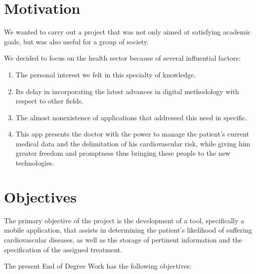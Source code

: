 \documentclass[11pt,spanish,
		listoftables,listoffigures]
		{tfgplantilla}
\begin{document}
\section{Motivation}

We wanted to carry out a project that was not only aimed at satisfying academic goals, but was also useful for a group of society.

We decided to focus on the health sector because of several influential factors:

\begin{enumerate}
	\item The personal interest we felt in this specialty of knowledge.

	\item Its delay in incorporating the latest advances in digital methodology with respect to other fields.

	\item The almost nonexistence of applications that addressed this need in specific.
	\item This app presents the doctor with the power to manage the patient's current medical data and the delimitation of his cardiovascular risk, while giving him greater freedom and promptness thus bringing these people to the new technologies.
\end{enumerate}

\section{Objectives}

The primary objective of the project is the development of a tool, specifically a mobile application, that assists in determining the patient's likelihood of suffering cardiovascular diseases, as well as the storage of pertinent information and the specification of the assigned treatment.

The present End of Degree Work has the following objectives:
\end{document}
